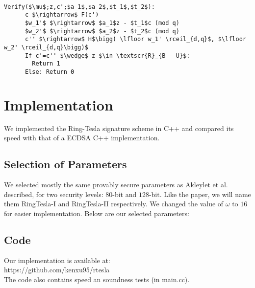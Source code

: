 \documentclass[letterpaper,twocolumn,10pt]{article}
\begin{document}
{\tt \small
  \begin{lstlisting}[mathescape, columns=flexible]
    Verify($\mu$;z,c';$a_1$,$a_2$,$t_1$,$t_2$):
      c $\rightarrow$ F(c')
      $w_1'$ $\rightarrow$ $a_1$z - $t_1$c (mod q)
      $w_2'$ $\rightarrow$ $a_2$z - $t_2$c (mod q)     
      c'' $\rightarrow$ H$\bigg( \lfloor w_1' \rceil_{d,q}$, $\lfloor w_2' \rceil_{d,q}\bigg)$
      If c'=c'' $\wedge$ z $\in \textscr{R}_{B - U}$:
        Return 1
      Else: Return 0
  \end{lstlisting}
}

\section{Implementation}
We implemented the Ring-Tesla signature scheme in C++ and compared its speed with that of a ECDSA C++ implementation.

\subsection{Selection of Parameters}
We selected mostly the same provably secure parameters as Akleylet et al. \cite{rTesla} described, for two security levels: $80$-bit and $128$-bit. Like the paper, we will name them RingTesla-I and RingTesla-II respectively.
We changed the value of $\omega$ to $16$ for easier implementation. Below are our selected parameters:\\


\subsection{Code}
Our implementation is available at: \\
https://github.com/kenxu95/rtesla\\

The code also contains speed an soundness tests (in main.cc).
\end{document}
